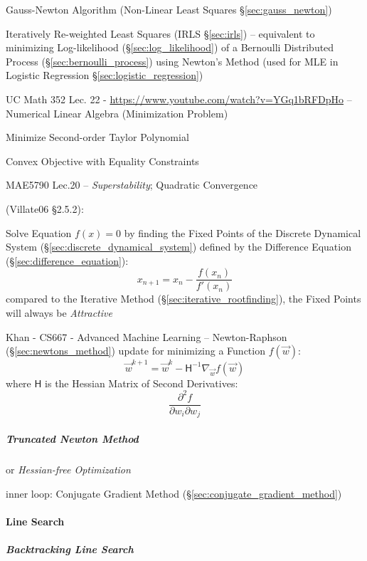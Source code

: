 \fist Gauss-Newton Algorithm (Non-Linear Least Squares \S\ref{sec:gauss_newton})

\fist Iteratively Re-weighted Least Squares (IRLS \S\ref{sec:irls}) --
equivalent to minimizing Log-likelihood (\S\ref{sec:log_likelihood}) of a
Bernoulli Distributed Process (\S\ref{sec:bernoulli_process}) using Newton's
Method (used for MLE in Logistic Regression \S\ref{sec:logistic_regression})

UC Math 352 Lec. 22 - \url{https://www.youtube.com/watch?v=YGq1bRFDpHo} --
Numerical Linear Algebra (Minimization Problem)

Minimize Second-order Taylor Polynomial

Convex Objective with Equality Constraints

MAE5790 Lec.20 -- \emph{Superstability}; Quadratic Convergence

(Villate06 \S 2.5.2):

Solve Equation $f(x) = 0$ by finding the Fixed Points of the Discrete Dynamical
System (\S\ref{sec:discrete_dynamical_system}) defined by the Difference
Equation (\S\ref{sec:difference_equation}):
\[
  x_{n+1} = x_n - \frac{f(x_n)}{f'(x_n)}
\]
compared to the Iterative Method (\S\ref{sec:iterative_rootfinding}), the Fixed
Points will always be \emph{Attractive}

Khan - CS667 - Advanced Machine Learning --
Newton-Raphson (\S\ref{sec:newtons_method}) update for minimizing a Function
$f(\vec{w})$:
\[
  \vec{w}^{k+1} = \vec{w}^k - \mathsf{H}^{-1}\nabla_{\vec{w}} f(\vec{w})
\]
where $\mathsf{H}$ is the Hessian Matrix of Second Derivatives:
\[
  \frac{\partial^2 f}{\partial{w_i} \partial{w_j}}
\]



\subparagraph{Truncated Newton Method}\label{sec:truncated_newton}\hfill

or \emph{Hessian-free Optimization}

inner loop: Conjugate Gradient Method (\S\ref{sec:conjugate_gradient_method})



\paragraph{Line Search}\label{sec:line_search}\hfill

\subparagraph{Backtracking Line Search}\label{sec:backtracking_line_search}
\hfill



